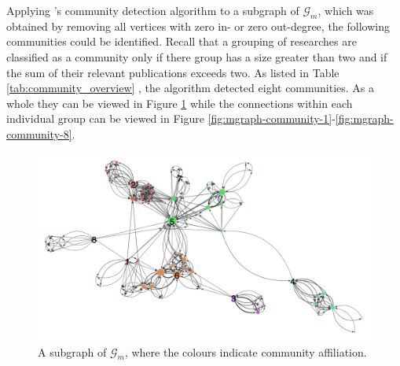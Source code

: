 \documentclass[11pt,a4paper]{book}
\theoremstyle{definition}
\theoremstyle{definition}
\theoremstyle{definition}
\theoremstyle{remark}
\newcommand{\pgraph}{\mathcal{G}_{p}}
\newcommand{\agraph}{\mathcal{G}_{a}}
\newcommand{\acgraph}{\mathcal{G}_{m}}
\begin{document}
%
%

Applying \parencite{rosvall2008maps}'s community detection algorithm to a subgraph of $\acgraph$, which was obtained by removing all vertices with zero in- or zero out-degree, the following communities could be identified. Recall that a grouping of researches are classified as a community only if there group has a size greater than two and if the sum of their relevant publications exceeds two.
As listed in Table \ref{tab:community_overview} , the algorithm detected eight communities. As a whole they can be viewed in Figure \ref{fig:mgraph-community} while the connections within each individual group can be viewed in Figure \ref{fig:mgraph-community-1}-\ref{fig:mgraph-community-8}.

\begin{figure}
\includegraphics[width=\textwidth]{mgraph_group.png}
\caption{A subgraph of $\acgraph$, where the colours indicate community affiliation.}
\label{fig:mgraph-community}
\end{figure}
\end{document}
